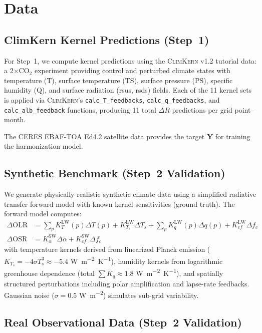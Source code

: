 \documentclass[11pt]{article}
\newcommand{\Wmsq}{\si{W.m^{-2}}}
\newcommand{\WmsqK}{\si{W.m^{-2}.K^{-1}}}
\newcommand{\oldsystem}{\textsc{ClimKern}}
\begin{document}
\section{Data}
\label{sec:data}

\subsection{ClimKern Kernel Predictions (Step~1)}

For Step~1, we compute kernel predictions using the
\oldsystem{} v1.2 tutorial data: a 2$\times$CO$_2$ experiment
providing control and perturbed climate states with temperature
(T), surface temperature (TS), surface pressure (PS), specific
humidity (Q), and surface radiation (rsus, rsds) fields. Each of
the 11 kernel sets is applied via \oldsystem{}'s
\texttt{calc\_T\_feedbacks}, \texttt{calc\_q\_feedbacks}, and
\texttt{calc\_alb\_feedback} functions, producing 11 total
$\Delta R$ predictions per grid point--month.

The CERES EBAF-TOA Ed4.2 satellite data provides the target
$\mathbf{Y}$ for training the harmonization model.

\subsection{Synthetic Benchmark (Step~2 Validation)}

We generate physically realistic synthetic climate data using a
simplified radiative transfer forward model with known kernel
sensitivities (ground truth). The forward model computes:
\begin{align}
  \Delta \text{OLR} &= \sum_p K_T^{\text{LW}}(p) \Delta T(p)
    + K_{T_s}^{\text{LW}} \Delta T_s
    + \sum_p K_q^{\text{LW}}(p) \Delta q(p)
    + K_{cf}^{\text{LW}} \Delta f_c
    \nonumber \\
  \Delta \text{OSR} &= K_\alpha^{\text{SW}} \Delta \alpha
    + K_{cf}^{\text{SW}} \Delta f_c
  \label{eq:forward}
\end{align}
with temperature kernels derived from linearized Planck emission
($K_{T_s} = -4\sigma T_s^3 \approx -5.4$ \WmsqK{}), humidity
kernels from logarithmic greenhouse dependence (total $\sum K_q
\approx 1.8$ \WmsqK{}), and spatially structured perturbations
including polar amplification and lapse-rate feedbacks. Gaussian
noise ($\sigma = 0.5$ \Wmsq{}) simulates sub-grid variability.

\subsection{Real Observational Data (Step~2 Validation)}
\end{document}
